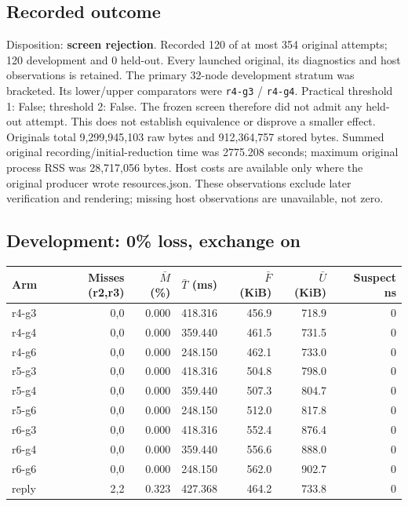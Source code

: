\subsection*{Recorded outcome}
Disposition: \textbf{screen rejection}. Recorded 120 of at most 354 original attempts; 120 development and 0 held-out. Every launched original, its diagnostics and host observations is retained.
The primary 32-node development stratum was bracketed. Its lower/upper comparators were \texttt{r4-g3} / \texttt{r4-g4}. Practical threshold 1: False; threshold 2: False. The frozen screen therefore did not admit any held-out attempt. This does not establish equivalence or disprove a smaller effect.
Originals total 9,299,945,103 raw bytes and 912,364,757 stored bytes. Summed original recording/initial-reduction time was 2775.208 seconds; maximum original process RSS was 28,717,056 bytes. Host costs are available only where the original producer wrote resources.json. These observations exclude later verification and rendering; missing host observations are unavailable, not zero.
\Needspace{190pt}
\subsection*{Development: 0\% loss, exchange on}
\begin{center}\small
\begin{tabular}{lrrrrrr}
Arm & Misses (r2,r3) & $\bar M$ (\%) & $\bar T$ (ms) & $\bar F$ (KiB) & $\bar U$ (KiB) & Suspect ns \\ \hline
r4-g3 & 0,0 & 0.000 & 418.316 & 456.9 & 718.9 & 0 \\
r4-g4 & 0,0 & 0.000 & 359.440 & 461.5 & 731.5 & 0 \\
r4-g6 & 0,0 & 0.000 & 248.150 & 462.1 & 733.0 & 0 \\
r5-g3 & 0,0 & 0.000 & 418.316 & 504.8 & 798.0 & 0 \\
r5-g4 & 0,0 & 0.000 & 359.440 & 507.3 & 804.7 & 0 \\
r5-g6 & 0,0 & 0.000 & 248.150 & 512.0 & 817.8 & 0 \\
r6-g3 & 0,0 & 0.000 & 418.316 & 552.4 & 876.4 & 0 \\
r6-g4 & 0,0 & 0.000 & 359.440 & 556.6 & 888.0 & 0 \\
r6-g6 & 0,0 & 0.000 & 248.150 & 562.0 & 902.7 & 0 \\
reply & 2,2 & 0.323 & 427.368 & 464.2 & 733.8 & 0 \\
\end{tabular}\end{center}
\Needspace{190pt}
